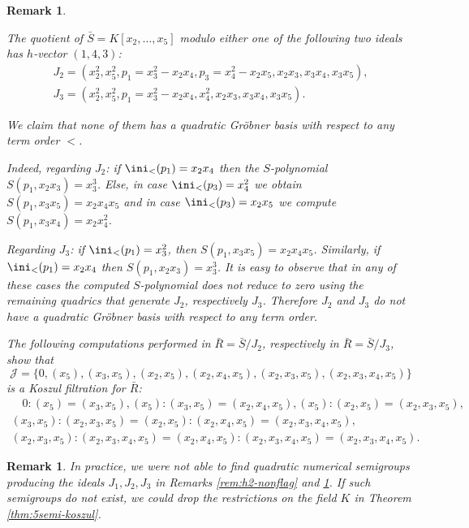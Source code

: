 \documentclass[12pt]{amsart}
\newtheorem{Remark}[Theorem]{Remark}
\begin{document}
\begin{Remark}
\label{rem:h3-nonflag}
{\em
The quotient of $\bar{S}=K[x_2,\dots, x_5]$ modulo either one of the following two ideals  has $h$-vector $(1,4,3)$:
\begin{eqnarray*}
J_2=(x_2^2, x_5^2, p_1=x_3^2-x_2x_4,  p_3= x_4^2-x_2x_5, x_2x_3,  x_3 x_4, x_3 x_5 ), \\
J_3= (x_2^2, x_5^2, p_1=x_3^2-x_2x_4, x_4^2, x_2x_3, x_3x_4, x_3x_5).
\end{eqnarray*}

We claim that none of them has a quadratic Gr\"obner basis with respect to any term order $<$.

Indeed, regarding $J_2$: if $\ini_<(p_1)= x_2x_4$ then the $S$-polynomial $S(p_1, x_2x_3)=x_3^3$. 
Else, in case $\ini_<(p_3)=x_4^2$ we obtain $S(p_1, x_3x_5)= x_2x_4x_5$ 
and in case $\ini_<(p_3)=x_2x_5$ we compute $S(p_1, x_3x_4)=x_2x_4^2$. 
 
Regarding $J_3$: if $\ini_<(p_1)=x_3^2$, then $S(p_1, x_3x_5)=x_2x_4x_5$. Similarly,  if $\ini_<(p_1)=x_2x_4$ then $S(p_1, x_2x_3)= x_3^3$.
It is easy to observe that in any of these cases the computed $S$-polynomial does not reduce to zero 
using the remaining quadrics that generate $J_2$, respectively $J_3$.  Therefore $J_2$ and $J_3$ do not have a quadratic Gr\"obner basis with respect to any term order.


The following computations performed in $\bar{R}=\bar{S}/J_2$, respectively in $\bar{R}=\bar{S}/J_3$,  show that 
\begin{equation*}
\mathcal{J}= \{ 0, (x_5), (x_3,x_5), (x_2, x_5),  (x_2, x_4, x_5), (x_2, x_3, x_5), (x_2, x_3, x_4, x_5)\}
\end{equation*}
 is a Koszul filtration for $\bar{R}$:
\begin{eqnarray*}
\quad 0: (x_5)= (x_3, x_5), (x_5):(x_3,x_5)= (x_2, x_4, x_5), (x_5): (x_2, x_5)=(x_2, x_3, x_5),  \\
  (x_3, x_5):(x_2, x_3, x_5)= (x_2,x_5): (x_2, x_4, x_5)= (x_2, x_3, x_4, x_5), \\ 
	(x_2, x_3, x_5): (x_2, x_3, x_4, x_5)= (x_2, x_4, x_5): (x_2, x_3, x_4, x_5)=(x_2, x_3, x_4, x_5). 
\end{eqnarray*}
}
\end{Remark}
 
\begin{Remark}
{\em
In practice, we were not able to find quadratic numerical semigroups producing the ideals $J_1, J_2, J_3$ in Remarks \ref{rem:h2-nonflag} and \ref{rem:h3-nonflag}. 
If such semigroups do not exist, we could drop the restrictions on the field $K$ in Theorem \ref{thm:5semi-koszul}.
}
\end{Remark}
\end{document}
